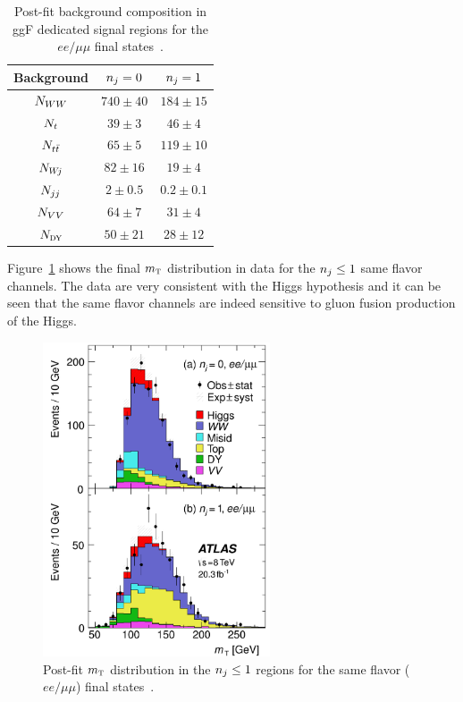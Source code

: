 \begin{table}[h!]
\centering
\captionsetup{justification=centering}

\hspace{-10pt}
\begin{tabular}{|c|c|c|}
\hline
Background & $n_j = 0$ & $n_j = 1$ \\ \hline
$N_{WW}$ & $740 \pm 40$ & $184 \pm 15$ \\ \hline
$N_{t}$ & $39 \pm 3$ & $46 \pm 4$ \\ \hline
$N_{t\bar{t}}$ & $65 \pm 5$ & $119 \pm 10$ \\ \hline
$N_{W\!j}$ & $82 \pm 16$ & $19 \pm 4$ \\ \hline
$N_{jj}$ & $2 \pm 0.5$ & $0.2 \pm 0.1$ \\ \hline
$N_{VV}$ & $64 \pm 7$ & $31 \pm 4$ \\ \hline
$N_{{\textsc{\footnotesize dy}}}$ & $50 \pm 21$ & $28 \pm 12$ \\ \hline
\end{tabular}

\caption{
Post-fit background composition in ggF dedicated signal regions for the $ee/\mu\mu$ final states~\cite{WW2015}. 
}
\label{tab:ggF_sf_bkg}
\end{table}

Figure~\ref{fig:ggF_mT_sf} shows the final $m_{\textrm{\footnotesize\sc t}}$ distribution in data for the $n_j \leq 1$ same flavor channels. The data are very consistent with the Higgs hypothesis and it can be seen that the same flavor channels are indeed sensitive to gluon fusion production of the Higgs. 

\begin{figure}[h!]
  \centering
  \captionsetup{justification=centering}

  \includegraphics[width=0.6\textwidth]{figures/ggF_mT_sameflavor}
  \caption{Post-fit $m_{\textrm{\footnotesize\sc t}}$ distribution in the $n_j \leq 1$ regions for the same flavor ($ee/\mu\mu$) final states~\cite{WW2015}.}
  \label{fig:ggF_mT_sf}
\end{figure}

